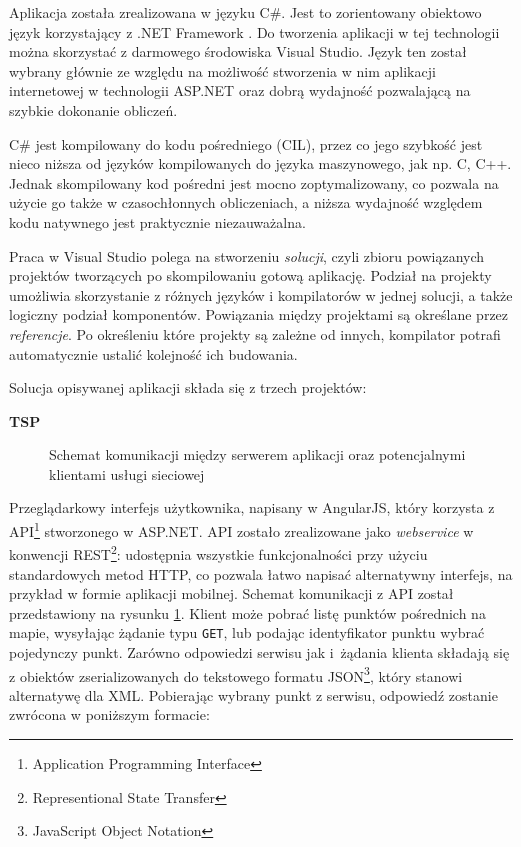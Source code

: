 Aplikacja została zrealizowana w języku C\#. Jest to zorientowany obiektowo język korzystający z .NET Framework \cite{csharp}. Do tworzenia aplikacji w tej technologii można skorzystać z darmowego środowiska Visual Studio. Język ten został wybrany głównie ze względu na możliwość stworzenia w nim aplikacji internetowej w technologii ASP.NET oraz dobrą wydajność pozwalającą na szybkie dokonanie obliczeń. 

C\# jest kompilowany do kodu pośredniego (CIL), przez co jego szybkość jest nieco niższa od języków kompilowanych do języka maszynowego, jak np. C, C++. Jednak skompilowany kod pośredni jest mocno zoptymalizowany, co pozwala na użycie go także w czasochłonnych obliczeniach, a niższa wydajność względem kodu natywnego jest praktycznie niezauważalna.

Praca w Visual Studio polega na stworzeniu \textit{solucji}, czyli zbioru powiązanych projektów tworzących po skompilowaniu gotową aplikację. Podział na projekty umożliwia skorzystanie z różnych języków i kompilatorów w jednej solucji, a także logiczny podział komponentów. Powiązania między projektami są określane przez \textit{referencje}. Po określeniu które projekty są zależne od innych, kompilator potrafi automatycznie ustalić kolejność ich budowania.

\noindent Solucja opisywanej aplikacji składa się z trzech projektów:

\medskip

\noindent \textbf{TSP} 

\begin{figure}
	\centering
	\def\svgwidth{\columnwidth}
	
	\caption{Schemat komunikacji między serwerem aplikacji oraz potencjalnymi klientami usługi sieciowej}
	\label{fig:rest_api}
\end{figure}

Przeglądarkowy interfejs użytkownika, napisany w AngularJS, który korzysta z API\footnote{Application Programming Interface} stworzonego w ASP.NET. API zostało zrealizowane jako \textit{webservice} w konwencji REST\footnote{Representional State Transfer}: udostępnia wszystkie funkcjonalności przy użyciu standardowych metod HTTP, co pozwala łatwo napisać alternatywny interfejs, na przykład w formie aplikacji mobilnej. Schemat komunikacji z API został przedstawiony na rysunku \ref{fig:rest_api}. Klient może pobrać listę punktów pośrednich na mapie, wysyłając żądanie typu \texttt{GET}, lub podając identyfikator punktu wybrać pojedynczy punkt. Zarówno odpowiedzi serwisu jak i~żądania klienta składają się z obiektów zserializowanych do tekstowego formatu JSON\footnote{JavaScript Object Notation}, który stanowi alternatywę dla XML. Pobierając wybrany punkt z serwisu, odpowiedź zostanie zwrócona w poniższym formacie:

